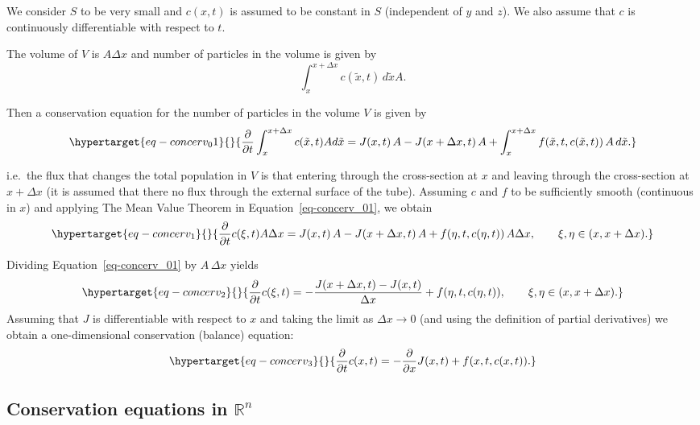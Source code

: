 \documentclass[
  letterpaper,
  DIV=11,
  numbers=noendperiod]{scrreprt}
\theoremstyle{plain}
\theoremstyle{definition}
\theoremstyle{plain}
\theoremstyle{remark}
\begin{document}
We consider \(S\) to be very small and \(c(x,t)\) is assumed to be
constant in \(S\) (independent of \(y\) and \(z\)). We also assume that
\(c\) is continuously differentiable with respect to \(t\).

The volume of \(V\) is \(A \Delta x\) and number of particles in the
volume is given by \[
\int_x^{x+\Delta x} c(\tilde x, t) \,  d \tilde x A.
\]

Then a conservation equation for the number of particles in the volume
\(V\) is given by \begin{equation}\protect\hypertarget{eq-concerv_01}{}{
\frac{\partial}{\partial t} \int_x^{x+\Delta x} c(\tilde x, t) A d\tilde x = J(x,t) \, A  - J(x+\Delta x,t) \, A +\int_x^{x + \Delta x}  f(\tilde x, t, c(\tilde x, t))\,  A \, d \tilde x.
}\label{eq-concerv_01}\end{equation}

i.e.~the flux that changes the total population in \(V\) is that
entering through the cross-section at \(x\) and leaving through the
cross-section at \(x+\Delta x\) (it is assumed that there no flux
through the external surface of the tube). Assuming \(c\) and \(f\) to
be sufficiently smooth (continuous in \(x\)) and applying The Mean Value
Theorem in Equation~\ref{eq-concerv_01}, we obtain
\begin{equation}\protect\hypertarget{eq-concerv_1}{}{
\frac{\partial}{\partial t} c(\xi, t) A \Delta x = J(x,t) \, A  - J(x+\Delta x,t) \, A +  f(\eta,t,c(\eta, t))\,  A \Delta x, \qquad \xi, \eta \in (x, x+ \Delta x).
}\label{eq-concerv_1}\end{equation}

Dividing Equation~\ref{eq-concerv_01} by \(A \, \Delta x\) yields
\begin{equation}\protect\hypertarget{eq-concerv_2}{}{
\frac{\partial}{\partial t} c(\xi, t)  = - \frac  {J(x+\Delta x,t ) - J(x,t)} { \Delta x} + f(\eta,t,c(\eta, t)), \qquad \xi, \eta \in (x, x+ \Delta x).
}\label{eq-concerv_2}\end{equation} Assuming that \(J\) is
differentiable with respect to \(x\) and taking the limit as
\(\Delta x \to 0\) (and using the definition of partial derivatives) we
obtain a one-dimensional conservation (balance) equation:
\begin{equation}\protect\hypertarget{eq-concerv_3}{}{
\frac{\partial}{\partial t} c(x,t)  = - \frac  {\partial} { \partial x} J(x,t) + f(x,t ,c(x,t)).
}\label{eq-concerv_3}\end{equation}

\hypertarget{conservation-equations-in-mathbb-rn}{%
\subsection{\texorpdfstring{Conservation equations in
\(\mathbb R^n\)}{Conservation equations in \textbackslash mathbb R\^{}n}}\label{conservation-equations-in-mathbb-rn}}
\end{document}
